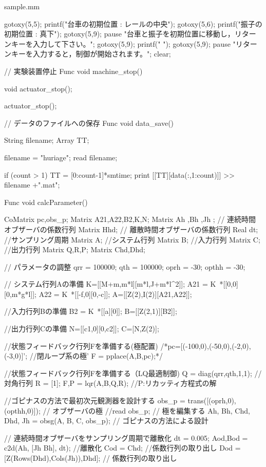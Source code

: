 \begin{breakitembox}[l]{sample.mm}
\begin{verbatimtab}[4]
{	gotoxy(5,5);
	printf("台車の初期位置 : レールの中央");
	gotoxy(5,6);
	printf("振子の初期位置 : 真下");
	gotoxy(5,9);
	pause "台車と振子を初期位置に移動し，リターンキーを入力して下さい。";
	gotoxy(5,9);
	printf("                                           ");
	gotoxy(5,9);
	pause "リターンキーを入力すると，制御が開始されます。";
	clear;
}

// 実験装置停止
Func void machine_stop()
{
	void actuator_stop();

	actuator_stop();
}

// データのファイルへの保存
Func void data_save()
{
	String filename;
	Array TT;

	filename = "huriage";
	read filename;

	if (count > 1) {
		TT = [0:count-1]*smtime;
		print [[TT][data(:,1:count)]] >> filename +".mat";
	}
}

Func void calcParameter(){

    CoMatrix pc,obs_p;
    Matrix A21,A22,B2,K,N;
	Matrix Ah ,Bh ,Jh ; // 連続時間オブザーバの係数行列
	Matrix Hhd; // 離散時間オブザーバの係数行列
	Real dt; //サンプリング周期
	Matrix A; //システム行列
	Matrix B; //入力行列
	Matrix C; //出力行列
	Matrix Q,R,P;
	Matrix Chd,Dhd;

    
	// パラメータの調整
	qrr = 100000;
	qth = 100000;
	oprh = -30;
	opthh = -30;

    // システム行列Aの準備
    K=[[M+m,m*l][m*l,J+m*l^2]];
	A21 = K~*[[0,0][0,m*g*l]];
	A22 = K~*[[-f,0][0,-c]];
	A=[[Z(2),I(2)][A21,A22]];

    //入力行列Bの準備
	B2 = K~*[[a][0]];
	B=[[Z(2,1)][B2]];

	//出力行列Cの準備
    N=[[c1,0][0,c2]];
    C=[N,Z(2)];

	//状態フィードバック行列Fを準備する(極配置)
    /*pc=[(-100,0),(-50,0),(-2,0),(-3,0)]'; //閉ループ系の極'
    F = pplace(A,B,pc);*/

    //状態フィードバック行列Fを準備する（LQ最適制御)
    Q = diag(qrr,qth,1,1); // 対角行列
    R = [1];
    {F,P} = lqr(A,B,Q,R); //P:リカッティ方程式の解

	//ゴピナスの方法で最初次元観測器を設計する
	obs_p = trans([(oprh,0), (opthh,0)]); // オブザーバの極
	//read obs_p; // 極を編集する
	{Ah, Bh, Chd, Dhd, Jh} = obsg(A, B, C, obs_p); // ゴピナスの方法による設計

	// 連続時間オブザーバをサンプリング周期で離散化
	dt = 0.005;
	{Aod,Bod} = c2d(Ah, [Jh Bh], dt); //離散化
	Cod = Chd; //係数行列の取り出し
	Dod = [Z(Rows(Dhd),Cols(Jh)),Dhd]; // 係数行列の取り出し
}


\end{verbatimtab}
\end{breakitembox}
